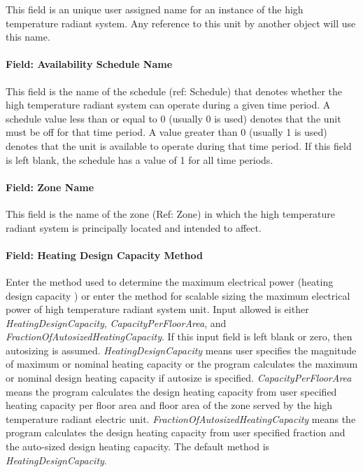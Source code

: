This field is an unique user assigned name for an instance of the high temperature radiant system. Any reference to this unit by another object will use this name.

\paragraph{Field: Availability Schedule Name}\label{field-availability-schedule-name-8-003}

This field is the name of the schedule (ref: Schedule) that denotes whether the high temperature radiant system can operate during a given time period. A schedule value less than or equal to 0 (usually 0 is used) denotes that the unit must be off for that time period. A value greater than 0 (usually 1 is used) denotes that the unit is available to operate during that time period. If this field is left blank, the schedule has a value of 1 for all time periods.

\paragraph{Field: Zone Name}\label{field-zone-name-3-004}

This field is the name of the zone (Ref: Zone) in which the high temperature radiant system is principally located and intended to affect.

\paragraph{Field: Heating Design Capacity Method}\label{field-heating-design-capacity-method-7}

Enter the method used to determine the maximum electrical power (heating design capacity ) or enter the method for scalable sizing the maximum electrical power of high temperature radiant system unit. Input allowed is either \emph{HeatingDesignCapacity}, \emph{CapacityPerFloorArea}, and \emph{FractionOfAutosizedHeatingCapacity}. If this input field is left blank or zero, then autosizing is assumed. \emph{HeatingDesignCapacity} means user specifies the magnitude of maximum or nominal heating capacity or the program calculates the maximum or nominal design heating capacity if autosize is specified. \emph{CapacityPerFloorArea} means the program calculates the design heating capacity from user specified heating capacity per floor area and floor area of the zone served by the high temperature radiant electric unit. \emph{FractionOfAutosizedHeatingCapacity} means the program calculates the design heating capacity from user specified fraction and the auto-sized design heating capacity. The default method is \emph{HeatingDesignCapacity}.

